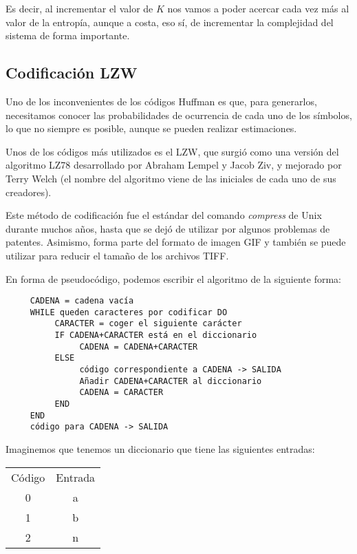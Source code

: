 \documentclass[es,apuntes]{uah}
\begin{document}
Es decir, al incrementar el valor de $K$ nos vamos a poder acercar cada vez más al valor de la entropía, aunque a costa, eso sí, de incrementar la complejidad del sistema de forma importante. 

\subsection{Codificación LZW}

Uno de los inconvenientes de los códigos Huffman es que, para generarlos, necesitamos conocer las probabilidades de ocurrencia de cada uno de los símbolos, lo que no siempre es posible, aunque se pueden realizar estimaciones. 

Unos de los códigos más utilizados es el LZW, que surgió como una versión del algoritmo LZ78 desarrollado por Abraham Lempel y Jacob Ziv, y mejorado por Terry Welch (el nombre del algoritmo viene de las iniciales de cada uno de sus creadores). 

Este método de codificación fue el estándar del comando \emph{compress} de Unix durante muchos años, hasta que se dejó de utilizar por algunos problemas de patentes. Asimismo, forma parte del formato de imagen GIF y también se puede utilizar para reducir el tamaño de los archivos TIFF.

En forma de pseudocódigo, podemos escribir el algoritmo de la siguiente forma:

\begin{verbatim}
     CADENA = cadena vacía
     WHILE queden caracteres por codificar DO
          CARACTER = coger el siguiente carácter
          IF CADENA+CARACTER está en el diccionario
               CADENA = CADENA+CARACTER
          ELSE
               código correspondiente a CADENA -> SALIDA
               Añadir CADENA+CARACTER al diccionario
               CADENA = CARACTER
          END
     END
   	 código para CADENA -> SALIDA
\end{verbatim}

Imaginemos que tenemos un diccionario que tiene las siguientes entradas: \\

\begin{tabular}{cc}
Código & Entrada \\
0 & a \\
1 & b \\	
2 & n \\
\end{tabular}
\ \\
\end{document}
